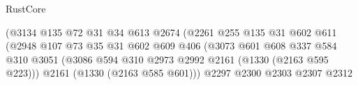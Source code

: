 \begin{lexlean}{RustCore}
\begin{coremodule}
{\begin{coremodule}
{{{{{{{{                                                  (@3134
                                                    @135
                                                    @72
                                                    @31
                                                    @34
                                                    @613
                                                    @2674
                                                    (@2261
                                                      @255
                                                      @135
                                                      @31
                                                      @602
                                                      @611
                                                      (@2948
                                                        @107
                                                        @73
                                                        @35
                                                        @31
                                                        @602
                                                        @609
                                                        @406
                                                        (@3073
                                                          @601
                                                          @608
                                                          @337
                                                          @584
                                                          @310
                                                          @3051
                                                          (@3086
                                                            @594
                                                            @310
                                                            @2973
                                                            @2992
                                                            @2161
                                                            (@1330 (@2163 @595 @223)))
                                                          @2161
                                                          (@1330 (@2163 @585 @601)))
                                                        @2297
                                                        @2300
                                                        @2303
                                                        @2307
                                                        @2312
}}}}}}}}
\end{coremodule}}
\end{coremodule}
\end{lexlean}

